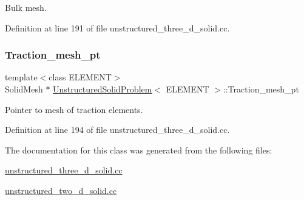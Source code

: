 Bulk mesh. 



Definition at line 191 of file unstructured\+\_\+three\+\_\+d\+\_\+solid.\+cc.

\mbox{\label{classUnstructuredSolidProblem_ade114e509464031ba8657600584b9743}} 
\subsubsection{\texorpdfstring{Traction\+\_\+mesh\+\_\+pt}{Traction\_mesh\_pt}}
{\footnotesize\ttfamily template$<$class E\+L\+E\+M\+E\+NT$>$ \\
Solid\+Mesh $\ast$ \hyperlink{classUnstructuredSolidProblem}{Unstructured\+Solid\+Problem}$<$ E\+L\+E\+M\+E\+NT $>$\+::Traction\+\_\+mesh\+\_\+pt\hspace{0.3cm}{\ttfamily [private]}}



Pointer to mesh of traction elements. 



Definition at line 194 of file unstructured\+\_\+three\+\_\+d\+\_\+solid.\+cc.



The documentation for this class was generated from the following files\+:\begin{DoxyCompactItemize}
\item 
\hyperlink{unstructured__three__d__solid_8cc}{unstructured\+\_\+three\+\_\+d\+\_\+solid.\+cc}\item 
\hyperlink{unstructured__two__d__solid_8cc}{unstructured\+\_\+two\+\_\+d\+\_\+solid.\+cc}\end{DoxyCompactItemize}
